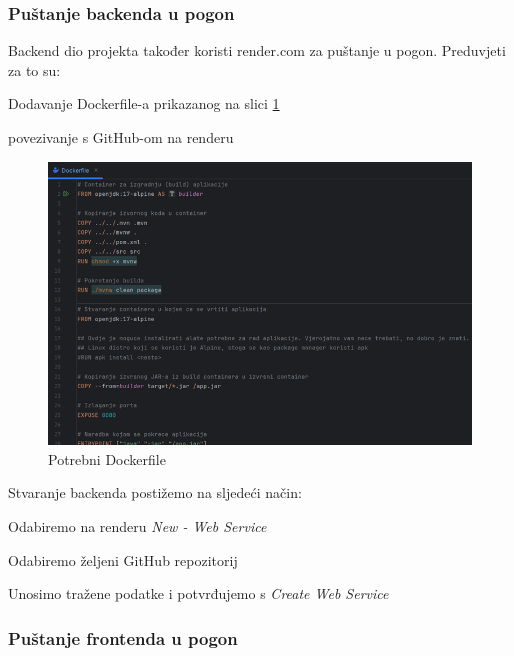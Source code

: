 			\subsubsection{Puštanje backenda u pogon}

			Backend dio projekta također koristi render.com za puštanje u pogon. Preduvjeti za to su:
			\begin{packed_item}
				\item Dodavanje Dockerfile-a prikazanog na slici \ref{fig:dockerfile}
				\item povezivanje s GitHub-om na renderu
			\end{packed_item}

			\begin{figure}[H]
				\includegraphics[scale=1]{slike/dockerfile.png}
				\centering
				\caption{Potrebni Dockerfile}
				\label{fig:dockerfile}
			\end{figure}

			Stvaranje backenda postižemo na sljedeći način:
			\begin{packed_item}
				\item Odabiremo na renderu \textit{New - Web Service}
				\item Odabiremo željeni GitHub repozitorij
				\item Unosimo tražene podatke i potvrđujemo s \textit{Create Web Service}
			\end{packed_item}

			\subsubsection{Puštanje frontenda u pogon}
			

			
			\eject 